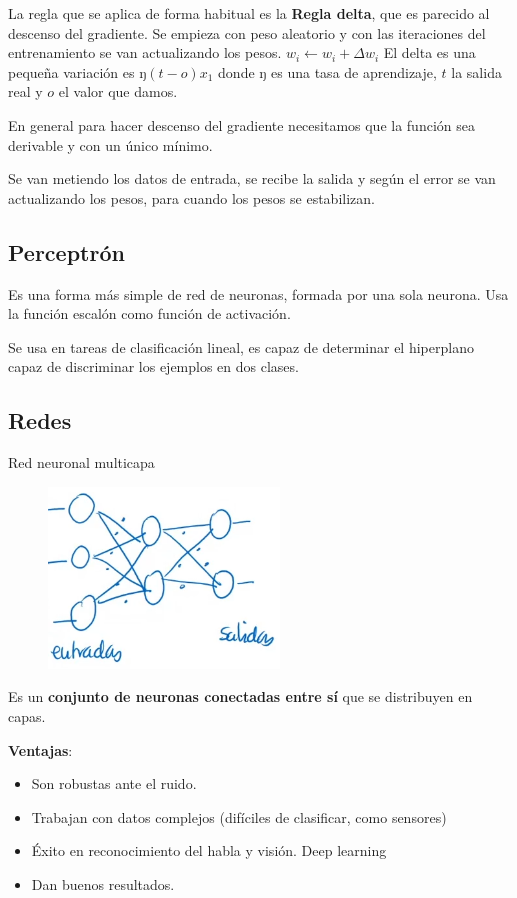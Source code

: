 \documentclass[12pt, twoside, openright]{report} %
\begin{document}
La regla que se aplica de forma habitual es la \textbf{Regla delta}, que
es parecido al descenso del gradiente. Se empieza con peso aleatorio y
con las iteraciones del entrenamiento se van actualizando los pesos.
\(w_i \leftarrow w_i+\Delta w_i\) El delta es una pequeña variación es
ŋ\((t-o)x_1\) donde ŋ es una tasa de aprendizaje, \(t\) la salida real y
\(o\) el valor que damos.

En general para hacer descenso del gradiente necesitamos que la función
sea derivable y con un único mínimo.

Se van metiendo los datos de entrada, se recibe la salida y según el error se van actualizando los pesos, para cuando los pesos se estabilizan.

\subsection{Perceptrón}

Es una forma más simple de red de neuronas, formada por una sola
neurona. Usa la función escalón como función de activación.

Se usa en tareas de clasificación lineal, es capaz de determinar el hiperplano capaz de discriminar los ejemplos en dos clases.

\subsection{Redes}

Red neuronal multicapa
\begin{figure}[H]
	{\includegraphics[scale=.82]{image-20210312102144206.png}}
\end{figure}
\vspace{-.5cm}
Es un \textbf{conjunto de neuronas conectadas entre sí} que se distribuyen en capas.

\textbf{Ventajas}:
\vspace{-.5cm}
\begin{itemize}

\item
  Son robustas ante el ruido.
\item
  Trabajan con datos complejos (difíciles de clasificar, como sensores)
\item
  Éxito en reconocimiento del habla y visión. Deep learning
\item
  Dan buenos resultados.
\end{itemize}
\end{document}
